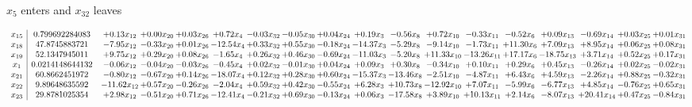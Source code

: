 \documentclass[9pt]{article}
\begin{document}
 $ x_{5} $ enters and $ x_{32} $ leaves 

 \[\begin{array}{c| c c@{\hskip 2pt} c@{\hskip 2pt} c@{\hskip 2pt} c@{\hskip 2pt} c@{\hskip 2pt} c@{\hskip 2pt} c@{\hskip 2pt} c@{\hskip 2pt} c@{\hskip 2pt} c@{\hskip 2pt} c@{\hskip 2pt} c@{\hskip 2pt} c@{\hskip 2pt} c@{\hskip 2pt} c@{\hskip 2pt} c@{\hskip 2pt} }
 x_{15}   &  0.799692284083 & +  0.13 x_{12} & +  0.00 x_{20} & +  0.03 x_{26} & +  0.72 x_{4} & -0.03 x_{32} & -0.05 x_{30} & +  0.04 x_{24} & +  0.19 x_{3} & -0.56 x_{8} & +  0.72 x_{10} & -0.33 x_{11} & -0.52 x_{6} & +  0.09 x_{13} & -0.69 x_{14} & +  0.03 x_{25} & +  0.01 x_{31}\\
 x_{18}   &  47.8745883721 & -7.95 x_{12} & -0.33 x_{20} & +  0.01 x_{26} & -12.54 x_{4} & +  0.33 x_{32} & +  0.55 x_{30} & -0.18 x_{24} & -14.37 x_{3} & -5.29 x_{8} & -9.14 x_{10} & -1.73 x_{11} & + 11.30 x_{6} & +  7.09 x_{13} & +  8.95 x_{14} & +  0.06 x_{25} & +  0.08 x_{31}\\
 x_{19}   &  52.1347945011 & +  9.75 x_{12} & +  0.29 x_{20} & +  0.08 x_{26} & -1.65 x_{4} & +  0.26 x_{32} & +  0.46 x_{30} & -0.69 x_{24} & -11.03 x_{3} & -5.20 x_{8} & + 11.33 x_{10} & -13.26 x_{11} & + 17.17 x_{6} & -18.75 x_{13} & +  3.71 x_{14} & +  0.52 x_{25} & +  0.17 x_{31}\\
 x_{1}   &  0.0214148644132 & -0.06 x_{12} & -0.04 x_{20} & -0.03 x_{26} & -0.45 x_{4} & +  0.02 x_{32} & -0.01 x_{30} & +  0.04 x_{24} & +  0.09 x_{3} & +  0.30 x_{8} & -0.34 x_{10} & +  0.10 x_{11} & +  0.29 x_{6} & +  0.45 x_{13} & -0.26 x_{14} & +  0.02 x_{25} & -0.02 x_{31}\\
 x_{21}   &  60.8662451972 & -0.80 x_{12} & -0.67 x_{20} & +  0.14 x_{26} & -18.07 x_{4} & +  0.12 x_{32} & +  0.28 x_{30} & +  0.60 x_{24} & -15.37 x_{3} & -13.46 x_{8} & -2.51 x_{10} & -4.87 x_{11} & +  6.43 x_{6} & +  4.59 x_{13} & -2.26 x_{14} & +  0.88 x_{25} & -0.32 x_{31}\\
 x_{22}   &  9.89648635592 & -11.62 x_{12} & +  0.57 x_{20} & -0.26 x_{26} & -2.04 x_{4} & +  0.59 x_{32} & +  0.42 x_{30} & -0.55 x_{24} & +  6.28 x_{3} & + 10.73 x_{8} & -12.92 x_{10} & +  7.07 x_{11} & -5.99 x_{6} & -6.77 x_{13} & +  4.85 x_{14} & -0.76 x_{25} & +  0.65 x_{31}\\
 x_{23}   &  29.8781025354 & +  2.98 x_{12} & -0.51 x_{20} & +  0.71 x_{26} & -12.41 x_{4} & -0.21 x_{32} & +  0.69 x_{30} & -0.13 x_{24} & +  0.06 x_{3} & -17.58 x_{8} & +  3.89 x_{10} & + 10.13 x_{11} & +  2.14 x_{6} & -8.07 x_{13} & + 20.41 x_{14} & +  0.47 x_{25} & -0.84 x_{31}\\

\end{array}\]
\end{document}
